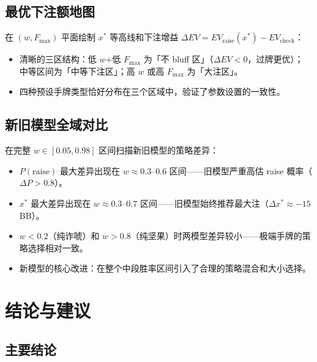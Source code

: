 \documentclass[12pt,a4paper]{ctexart}
\begin{document}
\subsection{最优下注额地图}

在 $(w, F_{\max})$ 平面绘制 $x^*$ 等高线和下注增益 $\Delta EV = EV_{\text{raise}}(x^*) - EV_{\text{check}}$：
\begin{itemize}
    \item 清晰的三区结构：低 $w$+低 $F_{\max}$ 为「不 bluff 区」（$\Delta EV < 0$，过牌更优）；
          中等区间为「中等下注区」；高 $w$ 或高 $F_{\max}$ 为「大注区」。
    \item 四种预设手牌类型恰好分布在三个区域中，验证了参数设置的一致性。
\end{itemize}

\subsection{新旧模型全域对比}

在完整 $w \in [0.05, 0.98]$ 区间扫描新旧模型的策略差异：
\begin{itemize}
    \item $P(\text{raise})$ 最大差异出现在 $w \approx 0.3$--$0.6$ 区间——旧模型严重高估 raise 概率（$\Delta P > 0.8$）。
    \item $x^*$ 最大差异出现在 $w \approx 0.3$--$0.7$ 区间——旧模型始终推荐最大注（$\Delta x^* \approx -15$ BB）。
    \item $w < 0.2$（纯诈唬）和 $w > 0.8$（纯坚果）时两模型差异较小——极端手牌的策略选择相对一致。
    \item 新模型的核心改进：在整个中段胜率区间引入了合理的策略混合和大小选择。
\end{itemize}

\section{结论与建议}

\subsection{主要结论}
\end{document}
